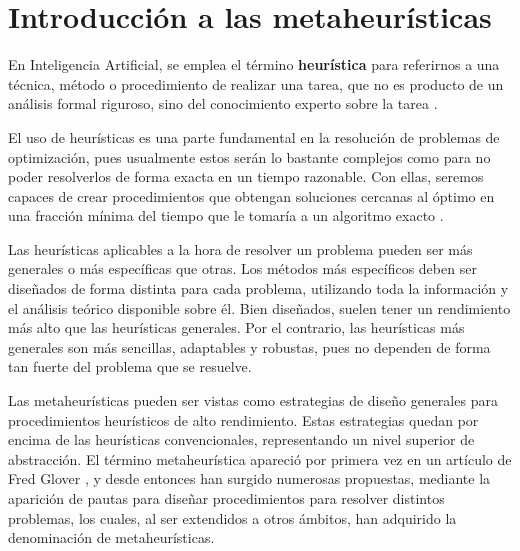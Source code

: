 \section{Introducción a las metaheurísticas}

En Inteligencia Artificial, se emplea el término \textbf{heurística} para referirnos
a una técnica, método o procedimiento de realizar una tarea, que no es producto de
un análisis formal riguroso, sino del conocimiento experto sobre la tarea \citep{melian:2003}.

El uso de heurísticas es una parte fundamental en la resolución de problemas de
optimización, pues usualmente estos serán lo bastante complejos como para no poder
resolverlos de forma exacta en un tiempo razonable. Con ellas, seremos capaces de crear
procedimientos que obtengan soluciones cercanas al óptimo en una fracción mínima del
tiempo que le tomaría a un algoritmo exacto \citep{herrera:2014}.

Las heurísticas aplicables a la hora de resolver un problema pueden ser más generales o más
específicas que otras. Los métodos más específicos deben ser diseñados de forma
distinta para cada problema, utilizando toda la información y el análisis teórico
disponible sobre él. Bien diseñados, suelen tener un rendimiento más alto que las
heurísticas generales. Por el contrario, las heurísticas más generales son más sencillas,
adaptables y robustas, pues no dependen de forma tan fuerte del problema que se resuelve.

Las metaheurísticas pueden ser vistas como estrategias de diseño generales para
procedimientos heurísticos de alto rendimiento. Estas estrategias quedan por encima
de las heurísticas convencionales, representando un nivel superior de abstracción.
El término metaheurística apareció por primera vez en un artículo de Fred Glover
\citep{glover:1986}, y desde entonces han surgido numerosas propuestas, mediante la
aparición de pautas para diseñar procedimientos para resolver distintos problemas,
los cuales, al ser extendidos a otros ámbitos, han adquirido la denominación de metaheurísticas.


